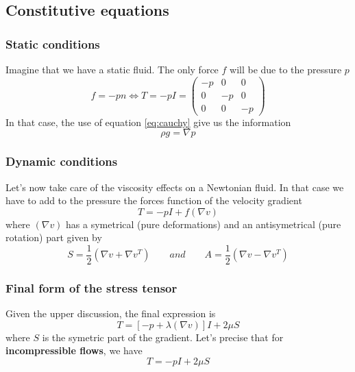 	\subsection{Constitutive equations}
		\subsubsection{Static conditions}
			Imagine that we have a static fluid. The only force $f$ will be due to the pressure $p$ 
			\begin{equation}
				f = -pn \Leftrightarrow T = -pI = 
				\left(
				\begin{array}{ccc}
				-p & 0 & 0 \\ 
				0 & -p & 0 \\ 
				0 & 0 & -p
				\end{array} 
				\right)
			\end{equation}
			In that case, the use of equation \autoref{eq:cauchy} give us the information
			\begin{equation}
				\rho g = \nabla p
			\end{equation}
			
		\subsubsection{Dynamic conditions}
			Let's now take care of the viscosity effects on a Newtonian fluid. In that case we have to add to the pressure the forces function of the velocity gradient 
			\begin{equation}
				T = -pI + f(\nabla v)
			\end{equation}
			where $(\nabla v)$ has a symetrical (pure deformations) and an antisymetrical (pure rotation) part given by
			\begin{equation}
				S = \frac{1}{2}(\nabla v + \nabla v ^T) \qquad and \qquad A = \frac{1}{2}(\nabla v - \nabla v ^T)
			\end{equation}
		
		\subsubsection{Final form of the stress tensor}
		Given the upper discussion, the final expression is 
		\begin{equation}
			T = \left[ -p + \lambda (\nabla v) \right]I + 2\mu S	
		\end{equation}		 
		where $S$ is the symetric part of the gradient. Let's precise that for \textbf{incompressible flows}, we have
		\begin{equation}
			T = -pI + 2\mu S
			\label{eq:incompressible}
		\end{equation}
		
